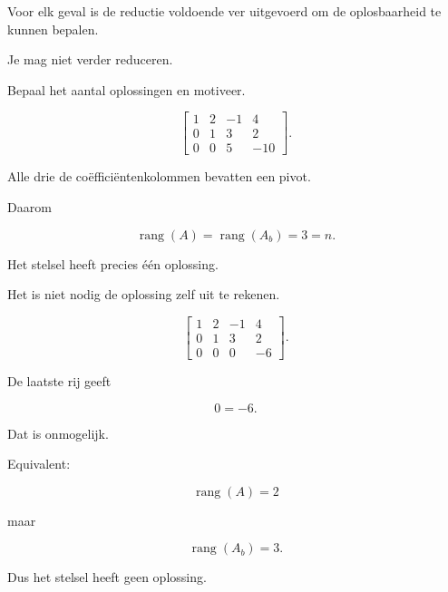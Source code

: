 \documentclass{ximera}
\begin{document}
\begin{oefening}{\oefU\ESS}

Voor elk geval is de reductie voldoende ver uitgevoerd om de oplosbaarheid
te kunnen bepalen.

Je mag niet verder reduceren.

Bepaal het aantal oplossingen en motiveer.


\begin{question}

\[
\left[
\begin{array}{ccc|c}
1&2&-1&4\\
0&1&3&2\\
0&0&5&-10
\end{array}
\right].
\]

\begin{oplossing}

Alle drie de coëfficiëntenkolommen bevatten een pivot.

Daarom

\[
\operatorname{rang}(A)
=
\operatorname{rang}(A_b)
=
3=n.
\]

Het stelsel heeft precies één oplossing.

Het is niet nodig de oplossing zelf uit te rekenen.

\end{oplossing}

\end{question}


\begin{question}

\[
\left[
\begin{array}{ccc|c}
1&2&-1&4\\
0&1&3&2\\
0&0&0&-6
\end{array}
\right].
\]

\begin{oplossing}

De laatste rij geeft

\[
0=-6.
\]

Dat is onmogelijk.

Equivalent:

\[
\operatorname{rang}(A)=2
\]

maar

\[
\operatorname{rang}(A_b)=3.
\]

Dus het stelsel heeft geen oplossing.

\end{oplossing}


\end{question}
\end{oefening}
\end{document}
